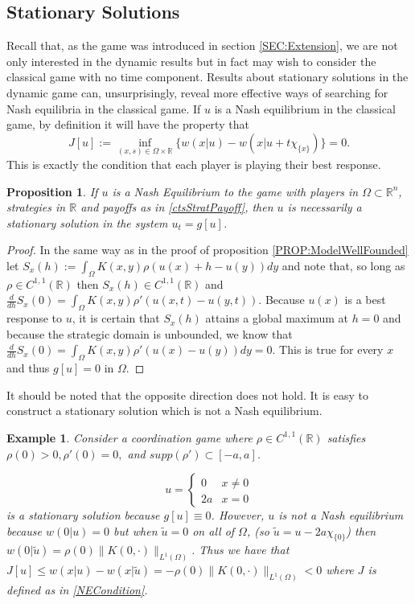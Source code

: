 \documentclass[aps,
preprint,
groupedaddress,
showkeys,
amsmath]{revtex4-2}
\newtheorem{proposition}{Proposition}
\newtheorem{example}{Example}
\begin{document}
    \subsection{Stationary Solutions}\label{SUBSEC:StationarySolutions}
    Recall that, as the game was introduced in section \ref{SEC:Extension}, we are not only interested in the dynamic results but in fact may wish to consider the classical game with no time component. Results about stationary solutions in the dynamic game can, unsurprisingly, reveal more effective ways of searching for Nash equilibria in the classical game. If $u$ is a Nash equilibrium in the classical game, by definition it will have the property that 
    \begin{equation}\label{NECondition}
    J[u]:=\inf_{(x,s)\in \Omega\times \mathbb{R}}\{w(x|u)-w(x|u+t\chi_{\{x\}})\}=0.\end{equation}
    This is exactly the condition that each player is playing their best response. 
    \begin{proposition}\label{PROP:StationarySolutions}
        If $u$ is a Nash Equilibrium to the game with players in $\Omega\subset\mathbb{R}^n$, strategies in $\mathbb{R}$ and payoffs as in \eqref{ctsStratPayoff}, then $u$ is necessarily a stationary solution in the system $u_t=g[u]$.
    \end{proposition}
    \begin{proof}
        In the same way as in the proof of proposition \ref{PROP:ModelWellFounded} let $S_x(h):=\int_\Omega K(x,y)\rho(u(x)+h-u(y))dy$ and note that, so long as $\rho\in C^{1,1}(\mathbb{R})$ then $S_x(h)\in C^{1,1}(\mathbb{R})$ and $\frac{d}{dh}S_x(0)=\int_\Omega K(x,y)\rho'(u(x,t)-u(y,t))$. Because $u(x)$ is a best response to $u$, it is certain that $S_x(h)$ attains a global maximum at $h=0$ and because the strategic domain is unbounded, we know that $\frac{d}{dh}S_x(0)=\int_\Omega K(x,y)\rho'(u(x)-u(y))dy=0$. This is true for every $x$ and thus $g[u]=0$ in $\Omega$.
    \end{proof}

    It should be noted that the opposite direction does not hold. It is easy to construct a stationary solution which is not a Nash equilibrium. 

    
    \begin{example}
        Consider a coordination game where $\rho\in C^{1,1}(\mathbb{R})$ satisfies $\rho(0)>0, \rho'(0)=0,$ and $supp(\rho')\subset[-a,a]$.
        
       \[u=\begin{cases}
        0&x\neq0\\
        2a&x=0
        \end{cases}\]
        is a stationary solution because $g[u]\equiv 0$. However, $u$ is not a Nash equilibrium because $w(0|u)=0$ but when $\tilde{u}=0$ on all of  $\Omega$, (so $\tilde{u}=u-2a\chi_{\{0\}}$) then $w(0|\tilde{u})=\rho(0)\|K(0,\cdot)\|_{L^1(\Omega)}$. Thus we have that $J[u]\leq w(x|u)-w(x|\tilde u)= -\rho(0)\|K(0,\cdot)\|_{L^1(\Omega)}<0$ where $J$ is defined as in \eqref{NECondition}.
    \end{example}
\end{document}
